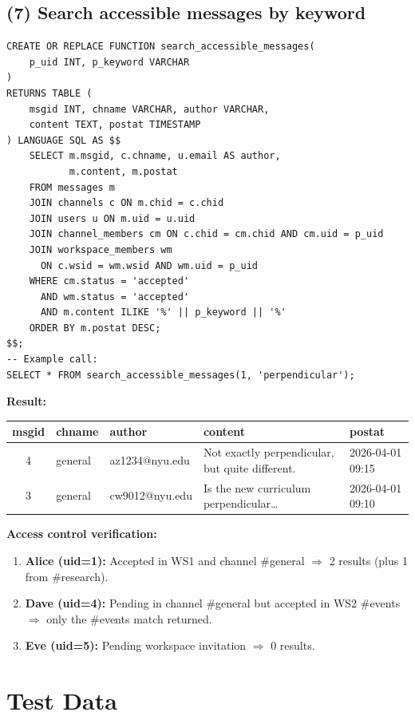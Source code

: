 \documentclass[11pt]{article}
\begin{document}
\subsection{(7) Search accessible messages by keyword}

\begin{lstlisting}
CREATE OR REPLACE FUNCTION search_accessible_messages(
    p_uid INT, p_keyword VARCHAR
)
RETURNS TABLE (
    msgid INT, chname VARCHAR, author VARCHAR,
    content TEXT, postat TIMESTAMP
) LANGUAGE SQL AS $$
    SELECT m.msgid, c.chname, u.email AS author,
           m.content, m.postat
    FROM messages m
    JOIN channels c ON m.chid = c.chid
    JOIN users u ON m.uid = u.uid
    JOIN channel_members cm ON c.chid = cm.chid AND cm.uid = p_uid
    JOIN workspace_members wm
      ON c.wsid = wm.wsid AND wm.uid = p_uid
    WHERE cm.status = 'accepted'
      AND wm.status = 'accepted'
      AND m.content ILIKE '%' || p_keyword || '%'
    ORDER BY m.postat DESC;
$$;
-- Example call:
SELECT * FROM search_accessible_messages(1, 'perpendicular');
\end{lstlisting}

\noindent\textbf{Result:}
\begin{center}
\tiny
\begin{tabular}{cllll}
\toprule
msgid & chname & author & content & postat \\
\midrule
4 & general & az1234@nyu.edu & Not exactly perpendicular, but quite different. & 2026-04-01 09:15 \\
3 & general & cw9012@nyu.edu & Is the new curriculum perpendicular\ldots & 2026-04-01 09:10 \\
\bottomrule
\end{tabular}
\end{center}

\noindent\textbf{Access control verification:}
\begin{enumerate}
    \item \textbf{Alice (uid=1):} Accepted in WS1 and channel \#general $\Rightarrow$ 2 results (plus 1 from \#research). \checkmark
    \item \textbf{Dave (uid=4):} Pending in channel \#general but accepted in WS2 \#events $\Rightarrow$ only the \#events match returned. \checkmark
    \item \textbf{Eve (uid=5):} Pending workspace invitation $\Rightarrow$ 0 results. \checkmark
\end{enumerate}

\newpage
\section{Test Data}
\label{sec:testdata}
\end{document}
